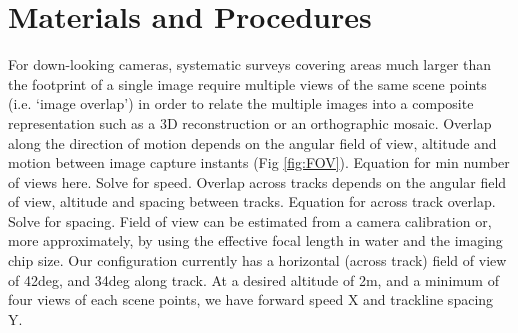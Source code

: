 \section{Materials and Procedures}


For down-looking cameras, systematic surveys covering areas much larger than the footprint of a single image require multiple views of the same scene points (i.e. `image overlap') in order to relate the multiple images into a composite representation such as a 3D reconstruction or an orthographic mosaic. Overlap along the direction of motion depends on the angular field of view, altitude and motion between image capture instants (Fig \ref{fig:FOV}). Equation for min number of views here. Solve for speed.
Overlap across tracks depends on the angular field of view, altitude and spacing between tracks. 
Equation for across track overlap. Solve for spacing.
Field of view can be estimated from a camera calibration or, more approximately, by using the effective focal length in water and the imaging chip size. Our configuration currently has a horizontal (across track) field of view of 42deg, and 34deg along track. At a desired altitude of 2m, and a minimum of four views of each scene points, we have forward speed X and trackline spacing Y. 
